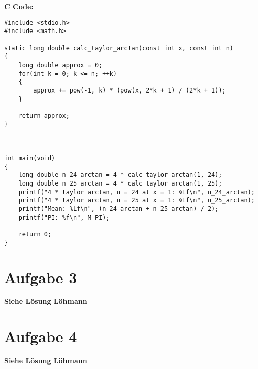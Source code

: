 \documentclass[a4paper, ngerman]{scrartcl}
\begin{document}
	\textbf{C Code:}
\begin{lstlisting}[style=mystyle]
#include <stdio.h>
#include <math.h>
	
static long double calc_taylor_arctan(const int x, const int n)
{
	long double approx = 0;
	for(int k = 0; k <= n; ++k)
	{
		approx += pow(-1, k) * (pow(x, 2*k + 1) / (2*k + 1));
	}
	
	return approx;
}
	
	
	
int main(void)
{
	long double n_24_arctan = 4 * calc_taylor_arctan(1, 24);
	long double n_25_arctan = 4 * calc_taylor_arctan(1, 25);
	printf("4 * taylor arctan, n = 24 at x = 1: %Lf\n", n_24_arctan);
	printf("4 * taylor arctan, n = 25 at x = 1: %Lf\n", n_25_arctan);
	printf("Mean: %Lf\n", (n_24_arctan + n_25_arctan) / 2);
	printf("PI: %f\n", M_PI);
		
	return 0;
}
	\end{lstlisting}
	
	\section*{Aufgabe 3}
	\textbf{Siehe Lösung Löhmann}
	
	\section*{Aufgabe 4}
	\textbf{Siehe Lösung Löhmann}
	
	
	
	
\end{document}
